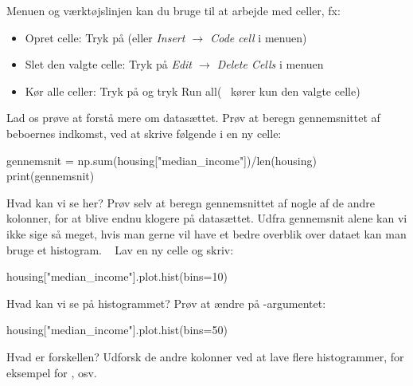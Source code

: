 \documentclass{ucph-handout}
\newcommand{\inlinegraphics}[1]{\raisebox{-.3\height}{\texttt{[image: \#1]}}}
\newcommand{\runbutton}{\inlinegraphics{images/run_button.png}}
\begin{document}
\begin{exercisebox}[adjusted title=Åbn ny Notebook]
Menuen og værktøjslinjen kan du bruge til at arbejde med celler, fx:
\begin{itemize}
    \item Opret celle: Tryk på \inlinegraphics{images/new_cell} (eller \textit{Insert $\rightarrow$ Code cell} i menuen)
    \item Slet den valgte celle: Tryk på \textit{Edit $\rightarrow$ Delete Cells} i menuen
    \item Kør alle celler: Tryk på \inlinegraphics{images/runtime.png} og tryk Run all( \runbutton\ kører kun den valgte celle)
\end{itemize}

\end{exercisebox}
\begin{exercisebox}[adjusted title=Udforsk datasættet]
Lad os prøve at forstå mere om datasættet. Prøv at beregn gennemsnittet af beboernes indkomst, ved at skrive følgende i en ny celle:
\begin{python}
gennemsnit = np.sum(housing["median_income"])/len(housing)
print(gennemsnit)
\end{python}

Hvad kan vi se her? Prøv selv at beregn gennemsnittet af nogle af de andre kolonner, for at blive endnu klogere på datasættet.
Udfra gennemsnit alene kan vi ikke sige så meget, hvis man gerne vil have et bedre overblik over dataet kan man bruge et histogram.\newline
\ \newline
Lav en ny celle og skriv:
\begin{python}
housing["median_income"].plot.hist(bins=10)
\end{python}
Hvad kan vi se på histogrammet? Prøv at ændre på -argumentet:
\begin{python}
housing["median_income"].plot.hist(bins=50)
\end{python}
Hvad er forskellen? Udforsk de andre kolonner ved at lave flere histogrammer, for eksempel for , osv.
\end{exercisebox}

\end{document}
